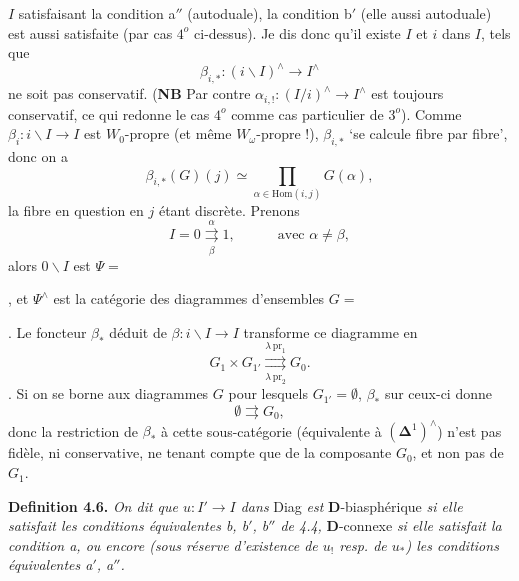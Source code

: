 \documentclass[11pt]{article}
\newcommand{\printedpage}[1]{\marginpar{\footnotesize p.~#1}}
\newcommand{\msp}[1]{\marginpar{\footnotesize [#1]}}
\newcommand{\D}{\mathbf{D}}
\begin{document}
\printedpage{39}

$I$ satisfaisant la condition a$''$ (autoduale), la condition b$'$ (elle aussi autoduale) est aussi satisfaite (par cas $4^o$ ci-dessus). Je dis donc qu'il existe $I$ et $i$ dans $I$, tels que
\[
\beta_{i,*} : (i\backslash I)^\wedge \longrightarrow I^\wedge
\]
ne soit pas conservatif. (\textbf{NB} Par contre $\alpha_{i,!} : (I/i)^\wedge \longrightarrow I^\wedge$ est toujours conservatif, ce qui redonne le cas $4^o$ comme cas particulier de $3^o$). Comme $\beta_i : i\backslash I \longrightarrow I$ est $W_0$-propre (et même $W_\omega$-propre !), $\beta_{i,*}$ `se calcule fibre par fibre', donc on a
\msp{page 64}
\[
\beta_{i,*}(G)(j) \simeq \prod_{\alpha\in\mathrm{Hom}(i,j)} G(\alpha),
\]
la fibre en question en $j$ étant discrète. Prenons
\[
I = 0 \underset{\beta}{\overset{\alpha}{\rightrightarrows}} 1, \qquad\quad \text{avec } \alpha \neq \beta,
\]
alors $0\backslash I$ est $\Psi = {}$, et $\Psi^\wedge$ est la catégorie des diagrammes d'ensembles $G = {}$. Le foncteur $\beta_*$ déduit de $\beta : i\backslash I \longrightarrow I$ transforme ce diagramme en
\[
G_1 \times G_{1'} \underset{\lambda\,\mathrm{pr}_2}{\overset{\lambda\,\mathrm{pr}_1}{\rightrightarrows}} G_0.
\]
. Si on se borne aux diagrammes $G$ pour lesquels $G_{1'} = \emptyset$, $\beta_*$ sur ceux-ci donne
\[
\emptyset \rightrightarrows G_0,
\]
donc la restriction de $\beta_*$ à cette sous-catégorie (équivalente à $(\boldsymbol{\Delta}^1)^\wedge$) n'est pas fidèle, ni conservative, ne tenant compte que de la composante $G_0$, et non pas de $G_1$.

\msp{page 63bis}

\textbf{Definition 4.6.} \textit{On dit que $u : I' \longrightarrow I$ dans} Diag \textit{est} $\D$-biasphérique \textit{si elle satisfait les conditions équivalentes b, b$'$, b$''$ de 4.4,} $\D$-connexe \textit{si elle satisfait la condition a, ou encore (sous réserve d'existence de $u_!$ resp. de $u_*$) les conditions équivalentes a$'$, a$''$.} %
\end{document}

